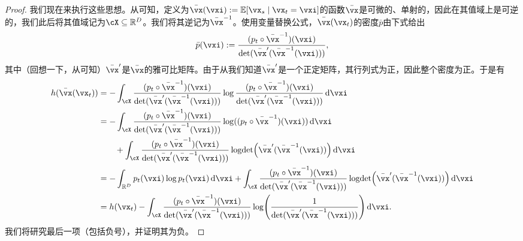 \documentclass[../../book-main.tex]{subfiles}
\begin{document}
\begin{proof}
    我们现在来执行这些思想。从可知，定义为\(\bar{\vx}(\vxi) := \Ex[\vx_{s} \given \vx_{t} = \vxi]\)的函数\(\bar{\vx}\)是可微的、单射的，因此在其值域上是可逆的，我们此后将其值域记为\(\cX \subseteq \R^{D}\)。我们将其逆记为\(\bar{\vx}^{-1}\)。使用变量替换公式，\(\bar{\vx}(\vx_{t})\)的密度\(\bar{p}\)由下式给出
    \begin{equation}
        \bar{p}(\vxi) := \frac{(p_{t} \circ \bar{\vx}^{-1})(\vxi)}{\det(\bar{\vx}^{\prime}(\bar{\vx}^{-1}(\vxi)))},
    \end{equation}
    其中（回想一下，从可知）\(\bar{\vx}^{\prime}\)是\(\bar{\vx}\)的雅可比矩阵。由于从我们知道\(\bar{\vx}^{\prime}\)是一个正定矩阵，其行列式为正，因此整个密度为正。于是有
    \begin{align}
        h(\bar{\vx}(\vx_{t}))
        &= -\int_{\cX}\frac{(p_{t} \circ \bar{\vx}^{-1})(\vxi)}{\det(\bar{\vx}^{\prime}(\bar{\vx}^{-1}(\vxi)))} \log \frac{(p_{t} \circ \bar{\vx}^{-1})(\vxi)}{\det(\bar{\vx}^{\prime}(\bar{\vx}^{-1}(\vxi)))} \odif{\vxi} \\ 
        &= -\int_{\cX}\frac{(p_{t} \circ \bar{\vx}^{-1})(\vxi)}{\det(\bar{\vx}^{\prime}(\bar{\vx}^{-1}(\vxi)))} \log((p_{t} \circ \bar{\vx}^{-1})(\vxi))\odif{\vxi} \\ 
        &\qquad + \int_{\cX}\frac{(p_{t} \circ \bar{\vx}^{-1})(\vxi)}{\det(\bar{\vx}^{\prime}(\bar{\vx}^{-1}(\vxi)))}\logdet\rp{\bar{\vx}^{\prime}(\bar{\vx}^{-1}(\vxi))}\odif{\vxi} \\ 
        &= -\int_{\R^{D}}p_{t}(\vxi)\log p_{t}(\vxi)\odif{\vxi} + \int_{\cX}\frac{(p_{t} \circ \bar{\vx}^{-1})(\vxi)}{\det(\bar{\vx}^{\prime}(\bar{\vx}^{-1}(\vxi)))}\logdet\rp{\bar{\vx}^{\prime}(\bar{\vx}^{-1}(\vxi))}\odif{\vxi} \\ 
        &= h(\vx_{t}) - \int_{\cX}\frac{(p_{t} \circ \bar{\vx}^{-1})(\vxi)}{\det(\bar{\vx}^{\prime}(\bar{\vx}^{-1}(\vxi)))}\log\rp{\frac{1}{\det(\bar{\vx}^{\prime}(\bar{\vx}^{-1}(\vxi)))}}\odif{\vxi}.
    \end{align}
    我们将研究最后一项（包括负号），并证明其为负。


\end{proof}
\end{document}
